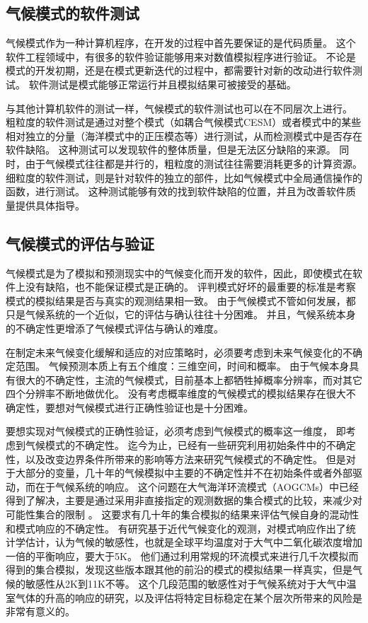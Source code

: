\subsection{气候模式的软件测试}
\label{related:softVerify}
气候模式作为一种计算机程序，在开发的过程中首先要保证的是代码质量。
这个软件工程领域中，有很多的软件验证能够用来对数值模拟程序进行验证\cite{whitner1989guidelines}。
不论是模式的开发初期，还是在模式更新迭代的过程中，都需要针对新的改动进行软件测试。
软件测试是模式能够正常运行并且模拟结果可被接受的基础\cite{oreskes1994verification,clune2011,easterbrook2011}。


与其他计算机软件的测试一样，气候模式的软件测试也可以在不同层次上进行。 
粗粒度的软件测试是通过对整个模式（如耦合气候模式CESM）或者模式中的某些相对独立的分量（海洋模式中的正压模态等）进行测试，从而检测模式中是否存在软件缺陷。
这种测试可以发现软件的整体质量，但是无法区分缺陷的来源。
同时，由于气候模式往往都是并行的，粗粒度的测试往往需要消耗更多的计算资源\cite{clune2011}。
细粒度的软件测试，则是针对软件的独立的部件，比如气候模式中全局通信操作的函数，进行测试。
这种测试能够有效的找到软件缺陷的位置，并且为改善软件质量提供具体指导。



\subsection{气候模式的评估与验证}
\label{related:climateValidation}

气候模式是为了模拟和预测现实中的气候变化而开发的软件，因此，即使模式在软件上没有缺陷，也不能保证模式是正确的。 
评判模式好坏的最重要的标准是考察模式的模拟结果是否与真实的观测结果相一致。
由于气候模式不管如何发展，都只是气候系统的一个近似，它的评估与确认往往十分困难\cite{martis2006validation}。
并且，气候系统本身的不确定性更增添了气候模式评估与确认的难度。 

在制定未来气候变化缓解和适应的对应策略时，必须要考虑到未来气候变化的不确定范围。
气候预测本质上有五个维度：三维空间，时间和概率。 
由于气候本身具有很大的不确定性，主流的气候模式，目前基本上都牺牲掉概率分辨率，而对其它四个分辨率不断地做优化。
没有考虑概率维度的气候模式的模拟结果存在很大不确定性，要想对气候模式进行正确性验证也是十分困难\cite{whitner1989guidelines}。


要想实现对气候模式的正确性验证，必须考虑到气候模式的概率这一维度， 即考虑到气候模式的不确定性。 
迄今为止，已经有一些研究利用初始条件中的不确定性，以及改变边界条件所带来的影响等方法来研究气候模式的不确定性。
但是对于大部分的变量，几十年的气候模拟中主要的不确定性并不在初始条件或者外部驱动，而在于气候系统的响应。
这个问题在大气海洋环流模式（AOGCMs）中已经得到了解决，主要是通过采用非直接指定的观测数据的集合模式的比较，来减少对可能性集合的限制\cite{allen2002towards} 。 
这要求有几十年的集合模拟的结果来评估气候自身的混动性和模式响应的不确定性。 
有研究基于近代气候变化的观测，对模式响应作出了统计学估计，认为气候的敏感性，也就是全球平均温度对于大气中二氧化碳浓度增加一倍的平衡响应，要大于5K\cite{stainforth2005uncertainty}。
他们通过利用常规的环流模式来进行几千次模拟而得到的集合模拟，发现这些版本跟其他的前沿的模式的模拟结果一样真实，但是气候的敏感性从2K到11K不等。
这个几段范围的敏感性对于气候系统对于大气中温室气体的升高的响应的研究，以及评估将特定目标稳定在某个层次所带来的风险是非常有意义的。



